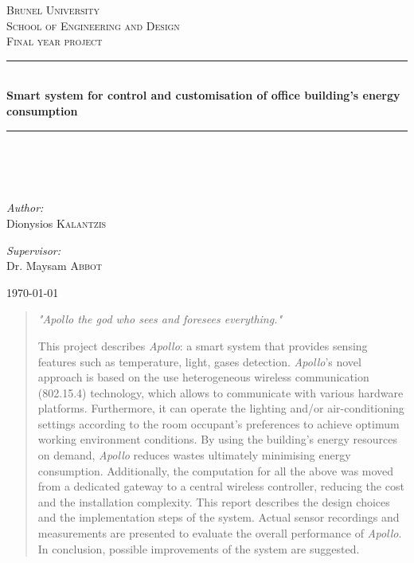 \documentclass[12pt,a4paper,draft]{report}
\author{Student: Dionisios Kalantzis (SID:0733139) \\ Supervisor: Dr. Maysam Abbod}
\begin{document}
\onehalfspacing
\begin{titlepage}
\begin{center}
%
\textsc{\LARGE Brunel University}\\[1.5cm]
\textsc{\LARGE School of Engineering and Design}\\[1cm]
%
\textsc{\Large Final year project}\\[1cm]
\hrule
\hfill\\[0.5cm]
{ \huge \bfseries Smart system for control and customisation of office building's energy consumption}\\[0.5cm]
\hrule
\hfill\\[0.5cm]
\ \\
\hfill\\[0.2cm]
\begin{minipage}{0.4\textwidth}
\begin{flushleft} \large
\emph{Author:}\\
Dionysios \textsc{Kalantzis}
\end{flushleft}
\end{minipage}
\begin{minipage}{0.4\textwidth}
\begin{flushright} \large
\emph{Supervisor:} \\
Dr. Maysam \textsc{Abbot}
\end{flushright}
\end{minipage}
\vfill
{\large \today}
\end{center}
\end{titlepage}
\newpage
%
\newpage
\begin{abstract}
\begin{center}
\emph{"Apollo the god who sees and foresees everything."}
\end{center}
%
This project describes \emph{Apollo}: a smart system that provides sensing features such as temperature, light, gases detection.
\emph{Apollo}'s novel approach is based on the use heterogeneous wireless communication (802.15.4) technology, which allows to communicate with various hardware platforms. 
Furthermore, it can operate the lighting and/or air-conditioning settings according to the room occupant's preferences to achieve optimum working environment conditions.
By using the building's energy resources on demand, \emph{Apollo} reduces wastes ultimately minimising energy consumption. 
Additionally, the computation for all the above was moved from a dedicated gateway to a central wireless controller, reducing the cost and the installation complexity. 
This report describes the design choices and the implementation steps of the system.
Actual sensor recordings and measurements are presented to evaluate the overall performance of \emph{Apollo}.
In conclusion, possible improvements of the system are suggested.

\end{abstract}
\end{document}
